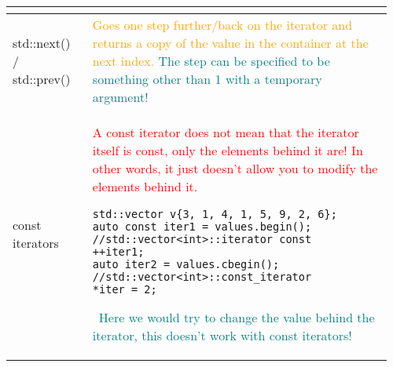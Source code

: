 \documentclass[main.tex,fontsize=8pt,paper=a4,paper=portrait,DIV=calc,]{scrartcl}
\begin{document}
\begin{table}[ht!]
\begin{tabular}{|m{0.2\linewidth}|m{0.755\linewidth}|}
\begin{itemize}
\end{itemize} \\
\hline
std::next() / std::prev() & 
\textcolor{orange}{Goes one step further/back on the iterator and returns a copy of the value in the container at the next index.}\newline
\textcolor{teal}{The step can be specified to be something other than 1 with a temporary argument!}\\
\hline
const iterators & 
\textcolor{red}{A const iterator does not mean that the iterator itself is const, only the elements behind it are! In other words, it just doesn't allow you to modify the elements behind it.}\newline
\begin{lstlisting}
std::vector v{3, 1, 4, 1, 5, 9, 2, 6};
auto const iter1 = values.begin(); //std::vector<int>::iterator const
++iter1;
auto iter2 = values.cbegin(); //std::vector<int>::const_iterator
*iter = 2;
\end{lstlisting}
\, \newline
\textcolor{teal}{Here we would try to change the value behind the iterator, this doesn't work with const iterators!}\\
\hline
\end{tabular}

\end{table}
\end{document}
